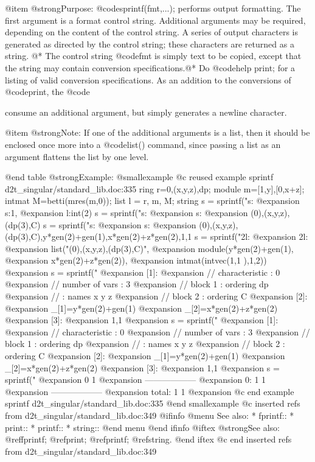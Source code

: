 @item @strong{Purpose:}
@code{sprintf(fmt,...);} performs output formatting. The first
argument is a format control string. Additional arguments may be
required, depending on the content of the control string. A series
of output characters is generated as directed by the control string;
these characters are returned as a string. @*
The control string @code{fmt} is simply text to be copied,
except that the string may contain conversion specifications.@*
Do @code{help print;} for a listing of valid conversion
specifications. As an addition to the conversions of @code{print},
the @code{%
consume an additional argument, but simply generates a newline
character.

@item @strong{Note:}
If one of the additional arguments is a list, then it should be
enclosed once more into a @code{list()} command, since passing a list
as an argument flattens the list by one level.

@end table
@strong{Example:}
@smallexample
@c reused example sprintf d2t_singular/standard_lib.doc:335 
  ring r=0,(x,y,z),dp;
module m=[1,y],[0,x+z];
intmat M=betti(mres(m,0));
list l = r, m, M;
string s = sprintf("s:%
@expansion{} s:1,
@expansion{}  l:int(2)
s = sprintf("s:%
@expansion{} s:
@expansion{} (0),(x,y,z),(dp(3),C)
s = sprintf("s:%
@expansion{} s:
@expansion{} (0),(x,y,z),(dp(3),C),y*gen(2)+gen(1),x*gen(2)+z*gen(2),1,1 
s = sprintf("2l:%
@expansion{} 2l:
@expansion{} list("(0),(x,y,z),(dp(3),C)",
@expansion{} module(y*gen(2)+gen(1),
@expansion{} x*gen(2)+z*gen(2)),
@expansion{} intmat(intvec(1,1 ),1,2))
@expansion{} 
s = sprintf("%
@expansion{} [1]:
@expansion{}    //   characteristic : 0
@expansion{} //   number of vars : 3
@expansion{} //        block   1 : ordering dp
@expansion{} //                  : names    x y z 
@expansion{} //        block   2 : ordering C
@expansion{} [2]:
@expansion{}    _[1]=y*gen(2)+gen(1)
@expansion{}    _[2]=x*gen(2)+z*gen(2)
@expansion{} [3]:
@expansion{}    1,1 
@expansion{} 
s = sprintf("%
@expansion{} [1]:
@expansion{}    //   characteristic : 0
@expansion{} //   number of vars : 3
@expansion{} //        block   1 : ordering dp
@expansion{} //                  : names    x y z 
@expansion{} //        block   2 : ordering C
@expansion{} [2]:
@expansion{}    _[1]=y*gen(2)+gen(1)
@expansion{}    _[2]=x*gen(2)+z*gen(2)
@expansion{} [3]:
@expansion{}    1,1 
@expansion{} 
s = sprintf("%
@expansion{}            0     1
@expansion{} ------------------
@expansion{}     0:     1     1
@expansion{} ------------------
@expansion{} total:     1     1
@expansion{} 
@c end example sprintf d2t_singular/standard_lib.doc:335
@end smallexample
@c inserted refs from d2t_singular/standard_lib.doc:349
@ifinfo
@menu
See also:
* fprintf::
* print::
* printf::
* string::
@end menu
@end ifinfo
@iftex
@strong{See also:}
@ref{fprintf};
@ref{print};
@ref{printf};
@ref{string}.
@end iftex
@c end inserted refs from d2t_singular/standard_lib.doc:349

}
